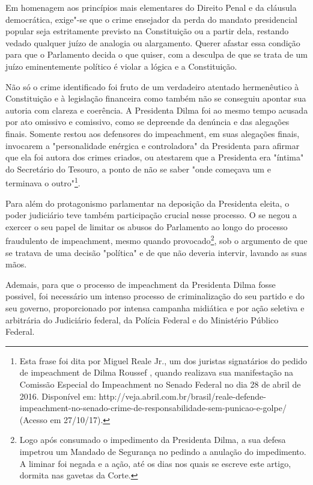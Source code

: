 Em homenagem aos princípios mais elementares do Direito Penal e da
cláusula democrática, exige"-se que o crime ensejador da perda do mandato
presidencial popular seja estritamente previsto na Constituição ou a
partir dela, restando vedado qualquer juízo de analogia ou alargamento.
Querer afastar essa condição para que o Parlamento decida o que quiser,
com a desculpa de que se trata de um juízo eminentemente político é
violar a lógica e a Constituição.

Não só o crime identificado foi fruto de um verdadeiro atentado
hermenêutico à Constituição e à legislação financeira como também não se
conseguiu apontar sua autoria com clareza e coerência. A Presidenta
Dilma foi ao mesmo tempo acusada por ato omissivo e comissivo, como se
depreende da denúncia e das alegações finais. Somente restou aos
defensores do impeachment, em suas alegações finais, invocarem a
"personalidade enérgica e controladora" da Presidenta para afirmar que
ela foi autora dos crimes criados, ou atestarem que a Presidenta era
"íntima" do Secretário do Tesouro, a ponto de não se saber "onde
começava um e terminava o outro"\footnote{Esta frase foi dita por Miguel
  Reale Jr., um dos juristas signatários do pedido de impeachment de
  Dilma Roussef , quando realizava sua manifestação na Comissão Especial
  do Impeachment no Senado Federal no dia 28 de abril de 2016.
  Disponível em:
  http://veja.abril.com.br/brasil/reale-defende-impeachment-no-senado-crime-de-responsabilidade-sem-punicao-e-golpe/
  (Acesso em 27/10/17).}.

Para além do protagonismo parlamentar na deposição da Presidenta eleita,
o poder judiciário teve também participação crucial nesse processo. O
 se negou a exercer o seu papel de limitar os abusos do Parlamento ao
longo do processo fraudulento de impeachment, mesmo quando
provocado\footnote{Logo após consumado o impedimento da Presidenta
  Dilma, a sua defesa impetrou um Mandado de Segurança no  pedindo a
  anulação do impedimento. A liminar foi negada e a ação, até os dias
  nos quais se escreve este artigo, dormita nas gavetas da Corte.}, sob
o argumento de que se tratava de uma decisão "política" e de que não
deveria intervir, lavando as suas mãos.

Ademais, para que o processo de impeachment da Presidenta Dilma fosse
possivel, foi necessário um intenso processo de criminalização do seu
partido e do seu governo, proporcionado por intensa campanha midiática e
por ação seletiva e arbitrária do Judiciário federal, da Polícia Federal
e do Ministério Público Federal.

